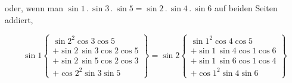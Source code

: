 oder, wenn man $\sin 1 \, . \, \sin 3 \, . \, \sin 5 = \sin 2 \, . \, \sin 4 \, . \, \sin 6$ auf beiden Seiten addiert,

\[
\sin 1 \left\{\begin{array}{l} \sin 2^2 \cos 3 \cos 5 \\ + \sin 2 \, \sin 3 \cos 2 \cos 5 \\ + \sin 2 \, \sin 5 \cos 2 \cos 3 \\ + \cos 2^2 \sin 3 \sin 5 \end{array}\right\}
= \sin 2 \left\{\begin{array}{l} \sin 1^2 \cos 4 \cos 5 \\ + \sin 1 \, \sin 4 \cos 1 \cos 6 \\ + \sin 1 \, \sin 6 \cos 1 \cos 4 \\ + \cos 1^2 \sin 4 \sin 6 \end{array}\right\}
\]

